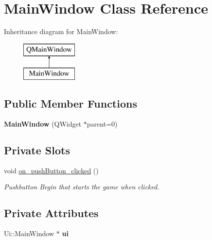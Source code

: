 \hypertarget{class_main_window}{}\section{Main\+Window Class Reference}
\label{class_main_window}
Inheritance diagram for Main\+Window\+:\begin{figure}[H]
\begin{center}
\leavevmode
\includegraphics[height=2.000000cm]{class_main_window}
\end{center}
\end{figure}
\subsection*{Public Member Functions}
\begin{DoxyCompactItemize}
\item 
{\bfseries Main\+Window} (Q\+Widget $\ast$parent=0)\hypertarget{class_main_window_a8b244be8b7b7db1b08de2a2acb9409db}{}\label{class_main_window_a8b244be8b7b7db1b08de2a2acb9409db}

\end{DoxyCompactItemize}
\subsection*{Private Slots}
\begin{DoxyCompactItemize}
\item 
void \hyperlink{class_main_window_a4de79c63c7fa0b8d7c468ac71f20be81}{on\+\_\+push\+Button\+\_\+clicked} ()
\begin{DoxyCompactList}\small\item\em Pushbutton Begin that starts the game when clicked. \end{DoxyCompactList}\end{DoxyCompactItemize}
\subsection*{Private Attributes}
\begin{DoxyCompactItemize}
\item 
Ui\+::\+Main\+Window $\ast$ {\bfseries ui}\hypertarget{class_main_window_a35466a70ed47252a0191168126a352a5}{}\label{class_main_window_a35466a70ed47252a0191168126a352a5}

\end{DoxyCompactItemize}


